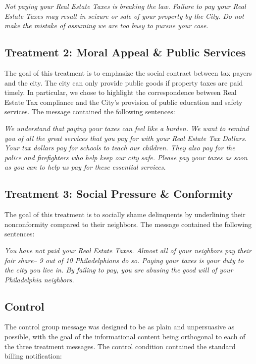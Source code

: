 \documentclass[12pt,titlepage]{article}
\begin{document}
{\it Not paying your Real Estate Taxes is breaking the law. Failure to
  pay your Real Estate Taxes may result in seizure or sale of your
  property by the City. Do not make the mistake of assuming we are too
  busy to pursue your case.}

\subsection{Treatment 2: Moral Appeal \& Public Services}

The goal of this treatment is to emphasize the social contract
between tax payers and the city. The city can only provide
public goods if property taxes are paid timely.  In particular, we
chose to highlight the correspondence between Real Estate Tax
compliance and the City's provision of public education and safety
services. The message contained the following sentences:

{\it We understand that paying your taxes can feel like a burden. We
  want to remind you of all the great services that you pay for with
  your Real Estate Tax Dollars. Your tax dollars pay for schools to
  teach our children.  They also pay for the police and firefighters
  who help keep our city safe.  Please pay your taxes as soon as you
  can to help us pay for these essential services.}

\subsection{Treatment 3: Social Pressure \& Conformity}

The goal of this treatment is to socially shame delinquents by
underlining their nonconformity compared to their neighbors.  The
message contained the following sentences:

{\it You have not paid your Real Estate Taxes. Almost all of your
  neighbors pay their fair share-- 9 out of 10 Philadelphians do
  so. Paying your taxes is your duty to the city you live in. By
  failing to pay, you are abusing the good will of your Philadelphia
  neighbors.}

\subsection{Control}

The control group message was designed to be as plain and unpersuasive as
possible, with the goal of the informational content being orthogonal
to each of the three treatment messages.  The control condition
contained the standard billing notification:
\end{document}
